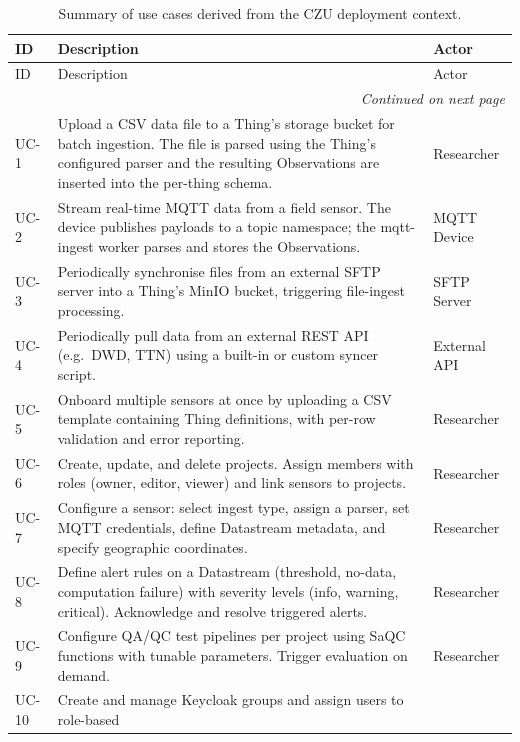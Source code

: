 \begin{longtable}{l p{} l}
  \caption{Summary of use cases derived from the CZU deployment context.}
  \label{tab:usecases} \\
  \toprule
  ID & Description & Actor \\
  \midrule
  \endfirsthead
  \toprule
  ID & Description & Actor \\
  \midrule
  \endhead
  \midrule
  \multicolumn{3}{r}{\emph{Continued on next page}} \\
  \endfoot
  \bottomrule
  \endlastfoot
  UC-1  & Upload a CSV data file to a Thing's storage bucket for batch ingestion.
          The file is parsed using the Thing's configured parser and the resulting
          Observations are inserted into the per-thing schema. & Researcher \\
  UC-2  & Stream real-time MQTT data from a field sensor. The device publishes
          payloads to a topic namespace; the mqtt-ingest worker parses
          and stores the Observations. & MQTT Device \\
  UC-3  & Periodically synchronise files from an external SFTP server into a
          Thing's MinIO bucket, triggering file-ingest processing. & SFTP Server \\
  UC-4  & Periodically pull data from an external REST API (e.g.\ DWD, TTN)
          using a built-in or custom syncer script. & External API \\
  UC-5  & Onboard multiple sensors at once by uploading a CSV template containing
          Thing definitions, with per-row validation and error reporting. & Researcher \\
  UC-6  & Create, update, and delete projects. Assign members with roles
          (owner, editor, viewer) and link sensors to projects. & Researcher \\
  UC-7  & Configure a sensor: select ingest type, assign a parser,
          set MQTT credentials, define Datastream metadata, and specify
          geographic coordinates. & Researcher \\
  UC-8  & Define alert rules on a Datastream (threshold, no-data, computation
          failure) with severity levels (info, warning, critical).
          Acknowledge and resolve triggered alerts. & Researcher \\
  UC-9  & Configure QA/QC test pipelines per project using SaQC functions with
          tunable parameters. Trigger evaluation on demand. & Researcher \\
  UC-10 & Create and manage Keycloak groups and assign users to role-based

\end{longtable}
